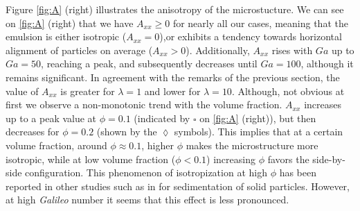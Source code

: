  
Figure \ref{fig:A} (right) illustrates the anisotropy of the microstucture. We can see on \ref{fig:A} (right) that we have $A_{xx} \ge 0$ for nearly all our cases, meaning that the emulsion is either isotropic ($A_{xx} = 0$),or exhibits a tendency towards horizontal alignment of particles on average ($A_{xx} >0$).%
Additionally, $A_{xx}$ rises with $Ga$ up to $Ga = 50$, reaching a peak, and subsequently decreases until $Ga = 100$, although it remains significant.
In agreement with the remarks of the previous section, the value of $A_{xx}$ is greater for $\lambda = 1$ and lower for  $\lambda = 10$.
Although, not obvious at first we observe a non-monotonic trend with the volume fraction. $A_{xx}$ increases up to a peak value at $\phi = 0.1$ (indicated by \textcolor{col3}{$\pmb\square$} on \ref{fig:A} (right)), but then decreases for $\phi=0.2$ (shown by the \textcolor{col4}{$\pmb\lozenge$} symbols).%
This implies that at a certain volume fraction, around $\phi \approx 0.1$, higher $\phi$ makes the microstructure more isotropic, while at low volume fraction ($\phi < 0.1$) increasing $\phi$ favors the side-by-side configuration.
This phenomenon of isotropization at high $\phi$ has been reported in other studies such as in \citet{seyed2021sedimentation} for sedimentation of solid particles. 
However, at high \textit{Galileo} number it seems that this effect is less pronounced. 


